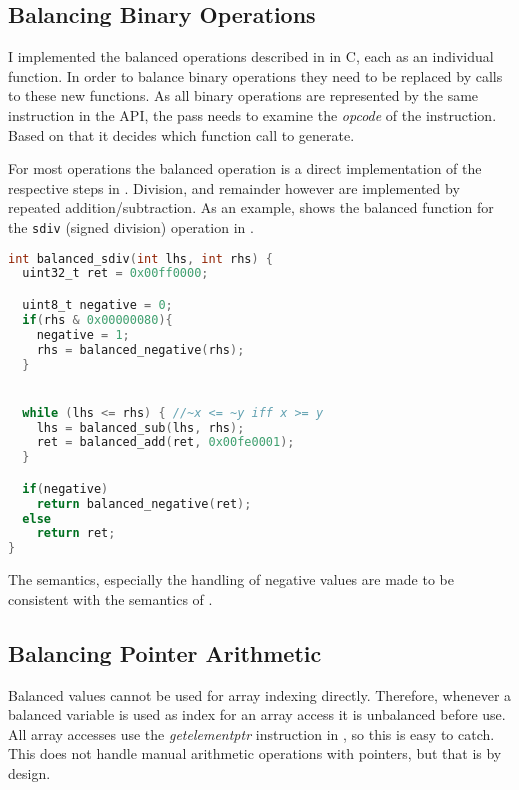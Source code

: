 
\subsection{Balancing Binary Operations}
I implemented the balanced operations described in  in C, each as an individual function.
In order to balance binary operations they need to be replaced by calls to these new functions.
As all binary operations are represented by the same instruction in the \llvm{} API, the pass needs to examine the \emph{opcode} of the instruction.
Based on that it decides which function call to generate.

For most operations the balanced operation is a direct implementation of the respective steps in .
Division, and remainder however are implemented by repeated addition/subtraction.
As an example,  shows the balanced function for the \texttt{sdiv} (signed division) operation in \ir{}.

\begin{lstlisting}[language=C, caption=Balanced sdiv, label=lst:sdiv]
int balanced_sdiv(int lhs, int rhs) {
  uint32_t ret = 0x00ff0000;

  uint8_t negative = 0;
  if(rhs & 0x00000080){
    negative = 1;
    rhs = balanced_negative(rhs);
  }


  while (lhs <= rhs) { //~x <= ~y iff x >= y
    lhs = balanced_sub(lhs, rhs);
    ret = balanced_add(ret, 0x00fe0001);
  }

  if(negative)
    return balanced_negative(ret);
  else
    return ret;
}
\end{lstlisting}

The semantics, especially the handling of negative values are made to be consistent with the semantics of \llvm{}.

\subsection{Balancing Pointer Arithmetic}
Balanced values cannot be used for array indexing directly.
Therefore, whenever a balanced variable is used as index for an array access it is unbalanced before use.
All array accesses use the \emph{getelementptr} instruction in \ir{}, so this is easy to catch.
This does not handle manual arithmetic operations with pointers, but that is by design.

